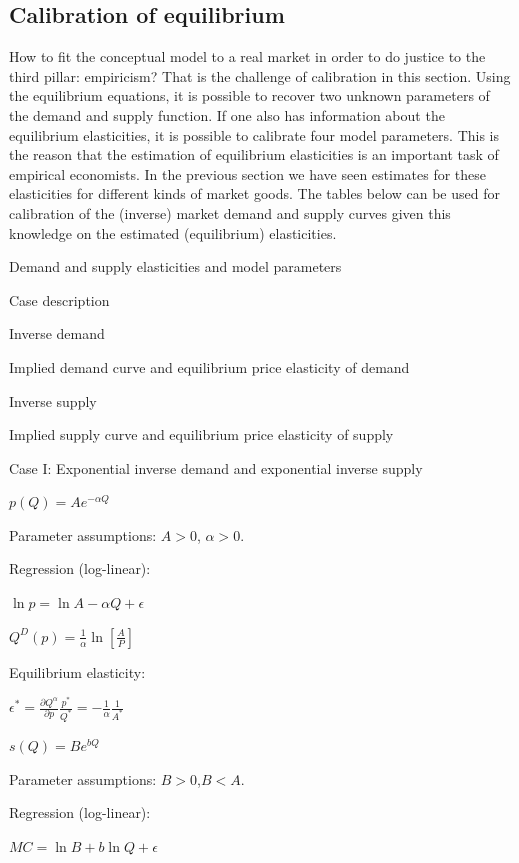 \documentclass[
]{book}
\begin{document}
\hypertarget{calibration-of-equilibrium}{%
\subsection{Calibration of equilibrium}\label{calibration-of-equilibrium}}

How to fit the conceptual model to a real market in order to do justice to the third pillar: empiricism? That is the challenge of calibration in this section. Using the equilibrium equations, it is possible to recover two unknown parameters of the demand and supply function. If one also has information about the equilibrium elasticities, it is possible to calibrate four model parameters. This is the reason that the estimation of equilibrium elasticities is an important task of empirical economists. In the previous section we have seen estimates for these elasticities for different kinds of market goods. The tables below can be used for calibration of the (inverse) market demand and supply curves given this knowledge on the estimated (equilibrium) elasticities.

\label{tab:demand}Demand and supply elasticities and model parameters

Case description

Inverse demand

Implied demand curve and equilibrium price elasticity of demand

Inverse supply

Implied supply curve and equilibrium price elasticity of supply

Case I: Exponential inverse demand and exponential inverse supply

\(p(Q)=Ae^{-\alpha Q}\)

Parameter assumptions:
\(A>0\), \(\alpha>0\).

Regression (log-linear):

\(\ln p = \ln A - \alpha Q + \epsilon\)

\(Q^D (p)=\frac{1}{\alpha} \ln\left[\frac{A}{P}\right]\)

Equilibrium elasticity:

\(\epsilon^\ast=\frac{\partial Q^\alpha}{\partial p}\frac{p^\ast}{Q^\ast}=-\frac{1}{\alpha}\frac{1}{A^\ast}\)

\(s(Q)=Be^{bQ}\)

Parameter assumptions:
\(B>0\),\(B<A\).

Regression (log-linear):

\(MC = \ln B +b \ln Q + \epsilon\)
\end{document}
